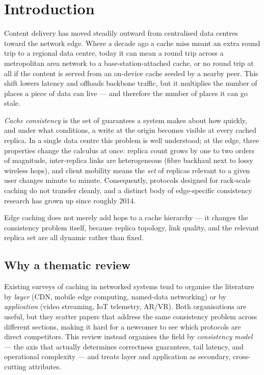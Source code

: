 \section{Introduction}
\label{sec:introduction}

Content delivery has moved steadily outward from centralised data centres toward the network edge.
Where a decade ago a cache miss meant an extra round trip to a regional data centre, today it can mean
a round trip across a metropolitan area network to a base-station-attached cache, or no round trip at
all if the content is served from an on-device cache seeded by a nearby peer. This shift lowers latency
and offloads backbone traffic, but it multiplies the number of places a piece of data can live --- and
therefore the number of places it can go stale.

\emph{Cache consistency} is the set of guarantees a system makes about how quickly, and under what
conditions, a write at the origin becomes visible at every cached replica. In a single data centre this
problem is well understood; at the edge, three properties change the calculus at once: replica count
grows by one to two orders of magnitude, inter-replica links are heterogeneous (fibre backhaul next to
lossy wireless hops), and client mobility means the \emph{set} of replicas relevant to a given user
changes minute to minute. Consequently, protocols designed for rack-scale caching do not transfer
cleanly, and a distinct body of edge-specific consistency research has grown up since roughly 2014.

\begin{keytakeaway}
Edge caching does not merely add hops to a cache hierarchy --- it changes the consistency problem
itself, because replica topology, link quality, and the relevant replica set are all dynamic rather
than fixed.
\end{keytakeaway}

\subsection{Why a thematic review}

Existing surveys of caching in networked systems tend to organise the literature by
\emph{layer} (CDN, mobile edge computing, named-data networking) or by \emph{application}
(video streaming, IoT telemetry, AR/VR). Both organisations are useful, but they scatter papers that
address the same consistency problem across different sections, making it hard for a newcomer to see
which protocols are direct competitors. This review instead organises the field by \emph{consistency
model} --- the axis that actually determines correctness guarantees, tail latency, and operational
complexity --- and treats layer and application as secondary, cross-cutting attributes.

